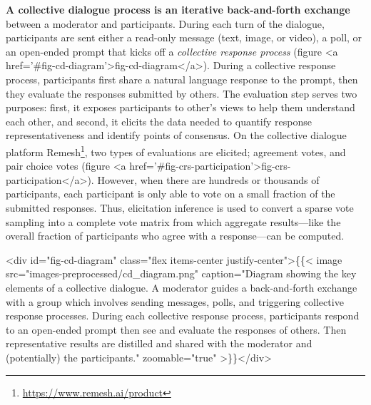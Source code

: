 \documentclass{article}
\begin{document}
\textbf{A collective dialogue process is an iterative back-and-forth exchange} between a moderator and participants. During each turn of the dialogue, participants are sent either a read-only message (text, image, or video), a poll, or an open-ended prompt that kicks off a \emph{collective response process} (figure <a href='#fig-cd-diagram'>fig-cd-diagram</a>). During a collective response process\cite{ovadya2023generative}, participants first share a natural language response to the prompt, then they evaluate the responses submitted by others. The evaluation step serves two purposes: first, it exposes participants to other’s views to help them understand each other, and second, it elicits the data needed to quantify response representativeness and identify points of consensus. On the collective dialogue platform Remesh\footnote{\url{https://www.remesh.ai/product}}, two types of evaluations are elicited; agreement votes, and pair choice votes (figure <a href='#fig-crs-participation'>fig-crs-participation</a>). However, when there are hundreds or thousands of participants, each participant is only able to vote on a small fraction of the submitted responses. Thus, elicitation inference \cite{konya2022elicitation,bilich2019faster} is used to convert a sparse vote sampling into a complete vote matrix from which aggregate results---like the overall fraction of participants who agree with a response---can be computed. 

<div id="fig-cd-diagram" class="flex items-center justify-center">\{\{< image src="images-preprocessed/cd_diagram.png" caption="Diagram showing the key elements of a collective dialogue. A moderator guides a back-and-forth exchange with a group which involves sending messages, polls, and triggering collective response processes. During each collective response process, participants respond to an open-ended prompt then see and evaluate the responses of others. Then representative results are distilled and shared with the moderator and (potentially) the participants." zoomable="true" >\}\}</div>
\end{document}
